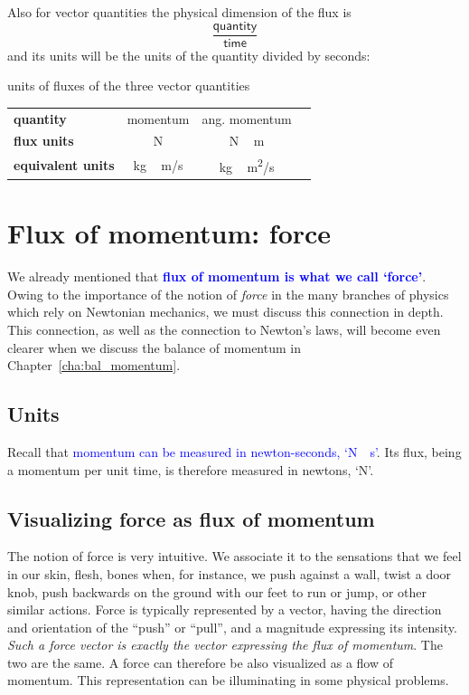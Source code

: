 \documentclass[a4paper,12pt,%
onecolumn,oneside,%
british%
]{memoir}
\renewcommand*{\|}[1][]{\nonscript\:#1\vert\nonscript\:\mathopen{}}
\newcommand*{\sect}{\S}%
\newcommand*{\chap}{Chapter}%
\renewcommand*{\autoref}[2]{\sidepar{\vspace{-1ex}\footnotesize{\color{blue}\faIcon{%
angle-right%
}\enspace\sect~\ref{#1} page~\pageref{#1}}}\textcolor{blue}{#2}}
\begin{document}
Also for vector quantities the physical dimension of the flux is
\begin{equation*}
  \frac{\textsf{quantity}}{\textsf{time}}
\end{equation*}
and its units will be the units of the quantity divided by seconds:
\begin{definition}{units of fluxes of the three vector quantities}
  \centering
  \begin{tabular*}{\linewidth}{@{\extracolsep{\fill}}lccc}
    \textbf{quantity}& momentum & ang. momentum
    \\[2\jot]
    \textbf{flux units}& \unit{N} & \unit{N\,m}
    \\[2\jot]
    \textbf{equivalent units}& \unit{kg\,m/s}  & \unit{kg\,m^2/s}
  \end{tabular*}
  \label{tab:fluxes_vector_units}
\end{definition}


\section{Flux of momentum: force}
\label{sec:force_is_flux}

We already mentioned that \autoref{sec:intro_momentum}{\textbf{flux of momentum is what we call \enquote*{force}}}. Owing to the importance of the notion of \emph{force} in the many branches of physics which rely on Newtonian mechanics, we must discuss this connection in depth. This connection, as well as the connection to Newton's laws, will become even clearer when we discuss the balance of momentum in \chap~\ref{cha:bal_momentum}.

\subsection{Units}
\label{sec:units_momflux}

Recall that \autoref{sec:intro_momentum}{momentum can be measured in newton-seconds, \enquote*{\unit{N\cdot s}}}. Its flux, being a momentum per unit time, is therefore measured in newtons, \enquote*{\unit{N}}.

\subsection{Visualizing force as flux of momentum}
\label{sec:visualize_force}

The notion of force is very intuitive. We associate it to the sensations that we feel in our skin, flesh, bones when, for instance, we push against a wall, twist a door knob, push backwards on the ground with our feet to run or jump, or other similar actions. Force is typically represented by a vector, having the direction and orientation of the \enquote{push} or \enquote{pull}, and a magnitude expressing its intensity. \emph{Such a force vector is exactly the vector expressing the flux of momentum}. The two are the same. A force can therefore be also visualized as a flow of momentum. This representation can be illuminating in some physical problems.
\end{document}
